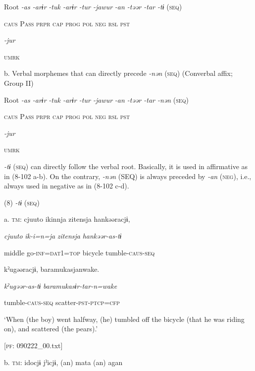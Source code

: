   Root  \textit{{}-as  {}-arɨr} %
\textit{{}-tuk  {}-arɨr  {}-tur  {}-jawur} %
\textit{{}-an  {}-təər  {}-tar  {}-tɨ} (\textsc{seq})

    \textsc{caus}  P\textsc{ass}  \textsc{prpr}  \textsc{cap}  \textsc{prog}  \textsc{pol}  \textsc{neg}  \textsc{rsl}  \textsc{pst}

          \textit{{}-jur} 

          \textsc{umrk}

  b. Verbal morphemes that can directly precede \textit{{}-nən} (\textsc{seq}) (Converbal affix; Group II)

  Root  \textit{{}-as  {}-arɨr} %
\textit{{}-tuk  {}-arɨr  {}-tur  {}-jawur} %
\textit{{}-an  {}-təər  {}-tar  {}-nən} (\textsc{seq})

    \textsc{caus}  P\textsc{ass}  \textsc{prpr}  \textsc{cap}  \textsc{prog}  \textsc{pol}  \textsc{neg}  \textsc{rsl}  \textsc{pst}

          \textit{{}-jur} 

          \textsc{umrk}

\textit{{}-tɨ} (\textsc{seq}) can directly follow the verbal root. Basically, it is used in affirmative as in (8-102 a-b). On the contrary, \textit{{}-nən} (SEQ) is always preceded by \textit{{}-an} (\textsc{neg}), i.e., always used in negative as in (8-102 c-d).

(8)  \textit{{}-tɨ} (\textsc{seq})

  a.  \textsc{tm}:  cjuuto  ikinnja  {\textbar}zitensja{\textbar}  hankəəracjɨ,

      \textit{cjuuto}  \textit{ik-i=n=ja}  \textit{zitensja}  \textit{hankəər-as-tɨ}

      middle  go-\textsc{inf}=\textsc{dat}1=\textsc{top}  bicycle  tumble-\textsc{caus}-\textsc{seq}

      kˀugəəracjɨ,  baramukasjanwake.

      \textit{kˀugəər-as-tɨ}  \textit{baramukasɨr-tar-n=wake}

      tumble-\textsc{caus}-\textsc{seq}  scatter-\textsc{pst}-\textsc{ptcp}=\textsc{cfp}

      ‘When (the boy) went halfway, (he) tumbled off the bicycle (that he was riding on), and scattered (the pears).’

      [\textsc{pf}: 090222\_00.txt]

  b.  \textsc{tm}:  idocjɨ  jˀicjɨ,  (an)  mata  (an)  agan

